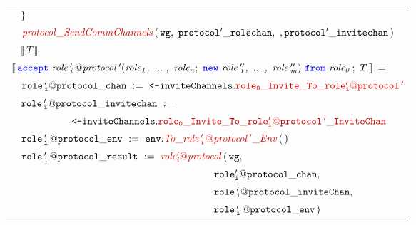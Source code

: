 \documentclass[12pt,twoside]{report}
\begin{document}
\begin{figure}[!h]
\begin{center}
\begin{tabular}{l}
            {\footnotesize
            $\quad \}$}\\[3pt]

            {\footnotesize
            $\quad \functionname{protocol\_SendCommChannels}\,\params{\wg,\ \varname{protocol'\_rolechan},\ ,\varname{protocol'\_invitechan}}$}\\[3pt]
            
            {\footnotesize
            $\quad \llbracket\,T\,\rrbracket$}\\[30pt]

            $\llbracket\,\acceptL{role\,'_i\,@protocol\,'}{role}{role\,''}{role_0}\,;\ T\,\rrbracket$ =\\[10pt]
            
            {\footnotesize
            $\quad \assignment{role\,'_i@protocol\_chan}{\texttt{<-}\structaccess{\invitechannels}{role_0\_Invite\_To\_\localprotocol{role'_i}{protocol\,'}}}$}\\[3pt]

            {\footnotesize
            $\quad {\mathtt{role\,'_i@protocol\_invitechan}}\ :=\ $}\\[3pt]
            
            {\footnotesize
            $\qquad \qquad \qquad\texttt{<-}\structaccess{\invitechannels}{role_0\_Invite\_To\_\localprotocol{role'_i}{protocol\,'}\_InviteChan}$}\\[3pt]

            {\footnotesize
            $\quad \assignment{role\,'_i\,@protocol\_env}{\methodcall{\envparam}{\functionname{To\_\localprotocol{role\,'_i\,}{protocol\,'}\_Env}}\,\emptyparams}$}\\[3pt]

            {\footnotesize
            $\quad \varname{role\,'_i\,@protocol\_result}\ :=\ \functionname{role'_i@protocol}\,(\,\wg,$}\\[3pt]
            
            {\footnotesize
            $\quad \qquad \qquad \qquad \qquad \qquad \qquad \qquad \qquad \qquad \quad \ \varname{role'_i@protocol\_chan},$}\\[3pt]

            {\footnotesize
            $\quad \qquad \qquad \qquad \qquad \qquad \qquad \qquad \qquad \qquad \quad \ \varname{role\,'_i@protocol\_inviteChan},$}\\[3pt]

            {\footnotesize
            $\quad \qquad \qquad \qquad \qquad \qquad \qquad \qquad \qquad \qquad \quad \ \varname{role\,'_i\,@protocol\_env}\,)$}\\[3pt]
            

\end{tabular}
\end{center}
\end{figure}
\end{document}
